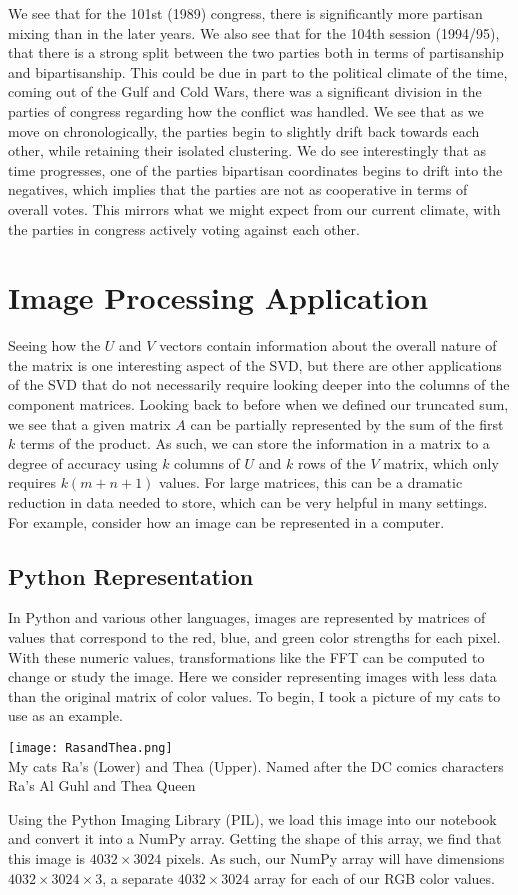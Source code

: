 \documentclass[letterpaper,12pt]{article}
\begin{document}
We see that for the 101st (1989) congress, there is significantly more partisan mixing than in the later years. We also see that for the 104th session (1994/95), that there is a strong split between the two parties both in terms of partisanship and bipartisanship. This could be due in part to the political climate of the time, coming out of the Gulf and Cold Wars, there was a significant division in the parties of congress regarding how the conflict was handled. We see that as we move on chronologically, the parties begin to slightly drift back towards each other, while retaining their isolated clustering. We do see interestingly that as time progresses, one of the parties bipartisan coordinates begins to drift into the negatives, which implies that the parties are not as cooperative in terms of overall votes. This mirrors what we might expect from our current climate, with the parties in congress actively voting against each other.
\section{Image Processing Application}
Seeing how the $U$ and $V$ vectors contain information about the overall nature of the matrix is one interesting aspect of the SVD, but there are other applications of the SVD that do not necessarily require looking deeper into the columns of the component matrices. Looking back to before when we defined our truncated sum, we see that a given matrix $A$ can be partially represented by the sum of the first $k$ terms of the product. As such, we can store the information in a matrix to a degree of accuracy using $k$ columns of $U$ and $k$ rows of the $V$ matrix, which only requires $k(m+n+1)$ values. For large matrices, this can be a dramatic reduction in data needed to store, which can be very helpful in many settings. For example, consider how an image can be represented in a computer.
\subsection{Python Representation}
In Python and various other languages, images are represented by matrices of values that correspond to the red, blue, and green color strengths for each pixel. With these numeric values, transformations like the FFT can be computed to change or study the image. Here we consider representing images with less data than the original matrix of color values. To begin, I took a picture of my cats to use as an example.
\begin{center}
\texttt{[image: RasandThea.png]}\\
My cats Ra's (Lower) and Thea (Upper). Named after the DC comics characters Ra's Al Guhl and Thea Queen
\end{center}
Using the Python Imaging Library (PIL), we load this image into our notebook and convert it into a NumPy array. Getting the shape of this array, we find that this image is $4032\times 3024$ pixels. As such, our NumPy array will have dimensions $4032\times 3024\times 3$, a separate $4032\times 3024$ array for each of our RGB color values.
\end{document}
